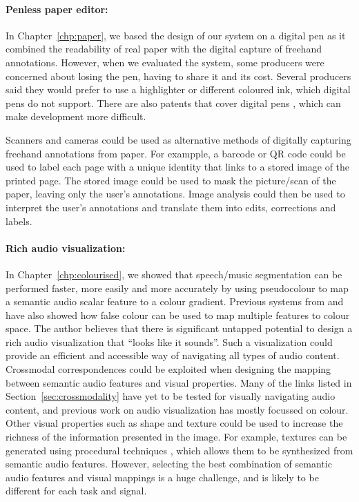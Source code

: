 \paragraph{Penless paper editor:}

In Chapter~\ref{chp:paper}, we based the design of our system on a digital pen as it combined the readability of real
paper with the digital capture of freehand annotations. However, when we evaluated the system, some producers were
concerned about losing the pen, having to share it and its cost. Several producers said they would prefer to use a
highlighter or different coloured ink, which digital pens do not support. There are also patents that cover digital
pens \citep{Fahraeus2003}, which can make development more difficult.

Scanners and cameras could be used as alternative methods of digitally capturing freehand annotations from paper.  For
exampple, a barcode or QR code could be used to label each page with a unique identity that links to a stored image of
the printed page. The stored image could be used to mask the picture/scan of the paper, leaving only the user's
annotations. Image analysis could then be used to interpret the user's annotations and translate them into edits,
corrections and labels.

\paragraph{Rich audio visualization:}

In Chapter~\ref{chp:colourised}, we showed that speech/music segmentation can be performed faster, more easily and more
accurately by using pseudocolour to map a semantic audio scalar feature to a colour gradient. Previous systems from
\citet{Tzanetakis2000} and \citet{Mason2007} have also showed how false colour can be used to map multiple features to
colour space.  The author believes that there is significant untapped potential to design a rich audio visualization
that ``looks like it sounds''. Such a visualization could provide an efficient and accessible way of navigating all
types of audio content.  Crossmodal correspondences could be exploited when designing the mapping between semantic
audio features and visual properties.  Many of the links listed in Section~\ref{sec:crossmodality} have yet to be
tested for visually navigating audio content, and previous work on audio visualization has mostly focussed on colour.
Other visual properties such as shape and texture could be used to increase the richness of the information presented
in the image.  For example, textures can be generated using procedural techniques \citep{Ebert1994}, which allows them
to be synthesized from semantic audio features.  However, selecting the best combination of semantic audio features and
visual mappings is a huge challenge, and is likely to be different for each task and signal.

